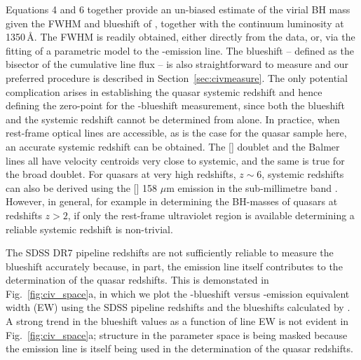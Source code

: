 Equations 4 and 6 together provide an un-biased estimate of the virial BH mass given the FWHM and blueshift of , together with the continuum luminosity at 1350\,\AA. 
The FWHM is readily obtained, either directly from the data, or, via the fitting of a parametric model to the -emission line. 
The blueshift -- defined as the bisector of the cumulative line flux -- is also straightforward to measure and our preferred procedure is described in Section~\ref{sec:civmeasure}.
The only potential complication arises in establishing the quasar systemic redshift and hence defining the zero-point for the -blueshift measurement, since both the blueshift and the systemic redshift cannot be determined from  alone. 
In practice, when rest-frame optical lines are accessible, as is the case for the quasar sample here, an accurate systemic redshift can be obtained. 
The [] doublet and the Balmer lines all have velocity centroids very close to systemic, and the same is true for the broad  doublet. 
For quasars at very high redshifts, $z\sim6$, systemic redshifts can also be derived using the [] 158 $\mu$m emission in the sub-millimetre band \citep[e.g.][]{venemans16}. 
However, in general, for example in determining the BH-masses of quasars at redshifts $z>2$, if only the rest-frame ultraviolet region is available determining a reliable systemic redshift is non-trivial. 

The SDSS DR7 pipeline redshifts are not sufficiently reliable to measure the  blueshift accurately because, in part, the  emission line itself contributes to the determination of the quasar redshifts. 
This is demonstated in Fig.~\ref{fig:civ_space}a, in which we plot the -blueshift versus -emission equivalent width (EW) using the SDSS pipeline redshifts and the blueshifts calculated by \citet{shen11}.  
A strong trend in the blueshift values as a function of line EW is not evident in Fig.~\ref{fig:civ_space}a; structure in the parameter space is being masked because the  emission line is itself being used in the determination of the quasar redshifts. 

